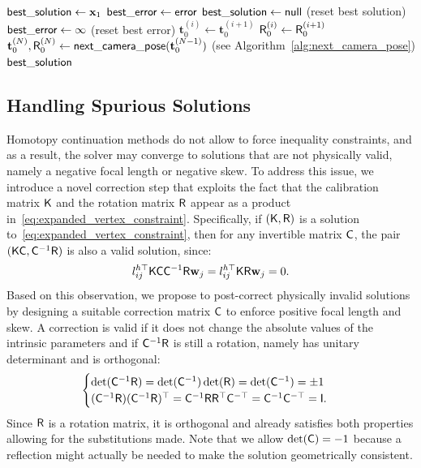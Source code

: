 \begin{algorithm}[H]
\begin{algorithmic}[1]
                \STATE $\mathsf{best\_solution} \gets \mathbf{x}_1$
                \STATE $\mathsf{best\_error} \gets \mathsf{error}$
            \ENDIF
        \ENDFOR
    \ENDFOR
        \STATE $\mathsf{best\_solution} \gets \mathsf{null}$ \; \; (reset best solution)
        \STATE $\mathsf{best\_error} \gets \infty$ \; \; (reset best error)
            \STATE $\mathbf{t}_0^{(i)} \gets \mathbf{t}_0^{(i+1)}$ \; \;
            \STATE $\mathsf{R}_0^{(i)} \gets \mathsf{R}_0^{(i+1)}$ \; \;
        \ENDFOR
        \STATE $\mathbf{t}_0^{(N)}, \mathsf{R}_0^{(N)} \gets \mathsf{next\_camera\_pose}(\mathbf{t}_0^{(N-1)})$ \; \; (see Algorithm~\ref{alg:next_camera_pose})
    \ELSE
        \RETURN $\mathsf{best\_solution}$
    \ENDIF
\ENDFOR
\end{algorithmic}
\end{algorithm}

\subsection{Handling Spurious Solutions}
\label{sec:postprocessing}
Homotopy continuation methods do not allow to force inequality constraints, and as a result, the solver may converge to solutions that are not physically valid, namely a negative focal length or negative skew. To address this issue, we introduce a novel correction step that exploits the fact that the calibration matrix $\mathsf{K}$ and the rotation matrix $\mathsf{R}$ appear as a product in~\eqref{eq:expanded_vertex_constraint}. Specifically, if $(\mathsf{K}, \mathsf{R})$ is a solution to~\eqref{eq:expanded_vertex_constraint}, then for any invertible matrix $\mathsf{C}$, the pair $(\mathsf{K}\mathsf{C}, \mathsf{C}^{-1}\mathsf{R})$ is also a valid solution, since:
\begin{equation}
    l^{h\top}_{ij} \mathsf{K} \mathsf{C} \mathsf{C}^{-1}\mathsf{R} \mathbf{w}_j = l^{h\top}_{ij} \mathsf{K} \mathsf{R} \mathbf{w}_j=0.
\end{equation}
Based on this observation, we propose to post-correct physically invalid solutions by designing a suitable correction matrix $\mathsf{C}$ to enforce  positive focal length and skew.
A correction is valid if it does not change the absolute values of the intrinsic parameters and if $\mathsf{C}^{-1}\mathsf{R}$ is still a rotation, namely has unitary determinant and is orthogonal:
\begin{equation}
\begin{cases}
  \det(\mathsf{C}^{-1}\mathsf{R}) = \det(\mathsf{C}^{-1})\det(\mathsf{R}) = \det(\mathsf{C}^{-1}) = \pm 1\\
   (\mathsf{C}^{-1}\mathsf{R}) (\mathsf{C}^{-1}\mathsf{R})^\top = \mathsf{C}^{-1}\mathsf{R}\mathsf{R}^\top\mathsf{C}^{-\top} = \mathsf{C}^{-1}\mathsf{C}^{-\top} = \mathsf{I}.
  \end{cases}
\end{equation}
Since $\mathsf{R}$ is a rotation matrix, it is orthogonal and already satisfies both properties allowing for the substitutions made.
Note that we allow $\det(\mathsf{C})=-1$ because  a reflection might actually be needed to make the solution geometrically consistent. 

